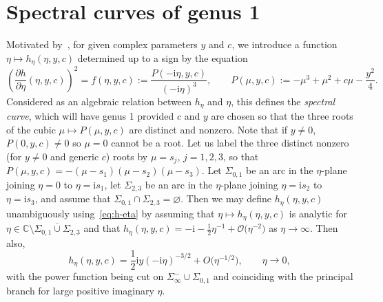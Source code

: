\documentclass[11pt]{article}
\numberwithin{equation}{section}
\numberwithin{equation}{section}
\begin{document}
\section{Spectral curves of genus 1}
Motivated by~\cite[Section 4.3]{BuckinghamM22}, for given complex parameters $y$ and $c$, we introduce a function $\eta\mapsto h_\eta(\eta,y,c)$ determined up to a sign by the equation
\begin{equation}
\left(\frac{\partial h}{\partial \eta}(\eta,y,c)\right)^2=f(\eta,y,c):=\frac{P(-\mathrm{i}\eta,y,c)}{(-\mathrm{i}\eta)^3},\qquad P(\mu,y,c):=-\mu^3+\mu^2+c\mu-\frac{y^2}{4}.
\label{eq:h-eta}
\end{equation}
Considered as an algebraic relation between $h_\eta$ and $\eta$, this defines the \emph{spectral curve}, which will have genus 1 provided $c$ and $y$ are chosen so that the three roots of the cubic $\mu\mapsto P(\mu,y,c)$ are distinct and nonzero. Note that if $y\neq 0$, $P(0,y,c)\neq 0$ so $\mu=0$ cannot be a root. Let us label the three distinct nonzero (for $y\neq 0$ and generic $c$) roots by $\mu=s_j$, $j=1,2,3$, so that $P(\mu,y,c)=-(\mu-s_1)(\mu-s_2)(\mu-s_3)$. Let $\Sigma_{0,1}$ be an arc in the $\eta$-plane joining $\eta=0$ to $\eta=\mathrm{i} s_1$, let $\Sigma_{2,3}$ be an arc in the $\eta$-plane joining $\eta=\mathrm{i} s_2$ to $\eta=\mathrm{i} s_3$, and assume that $\Sigma_{0,1}\cap\Sigma_{2,3}=\varnothing$.
Then we may define $h_\eta(\eta,y,c)$ unambiguously using~\eqref{eq:h-eta} by assuming that $\eta\mapsto h_\eta(\eta,y,c)$ is analytic for $\eta\in\mathbb{C}\setminus\overline{\Sigma_{0,1}\cup\Sigma_{2,3}}$ and that $h_\eta(\eta,y,c)=-\mathrm{i} -\frac{1}{2}\eta^{-1} +\mathcal{O}\bigl(\eta^{-2}\bigr)$ as $\eta\to\infty$. Then also,
\begin{equation*}
h_\eta(\eta,y,c)=\frac{1}{2}\mathrm{i} y(-\mathrm{i}\eta)^{-3/2}+O\bigl(\eta^{-1/2}\bigr),\qquad \eta\to 0,
\label{eq:hprime-zero}
\end{equation*}
with the power function being cut on $\Sigma_\infty^-\cup\Sigma_{0,1}$ and coinciding with the principal branch for large positive imaginary $\eta$.
\end{document}
